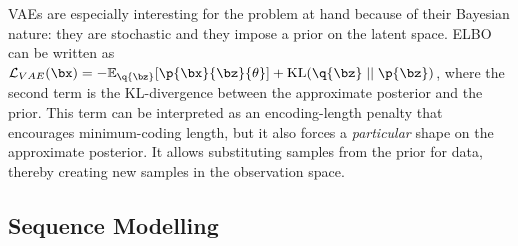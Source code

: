        VAEs are especially interesting for the problem at hand because of their Bayesian nature: they are stochastic and they impose a prior on the latent space. ELBO can be written as $\loss[VAE]{\bx} = -\expc{ \p{\bx}{\bz}{\theta} }{}{\q{\bz} } + \kl{ \q{\bz} }{ \p{\bz} }$, where the second term is the KL-divergence between the approximate posterior and the prior. This term can be interpreted as an encoding-length penalty that encourages minimum-coding length, but it also forces a \emph{particular} shape on the approximate posterior. It allows substituting samples from the prior for data, thereby creating new samples in the observation space.
%
%
    \subsection{Sequence Modelling}
    \label{sec:seq_model}
    
